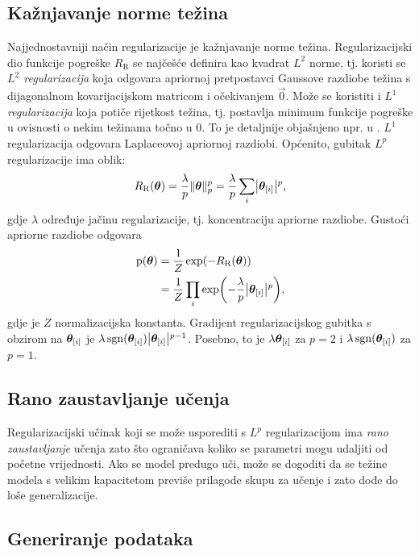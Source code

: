 \documentclass[utf8, diplomski, lmodern]{fer}
\begin{document}
\subsection{Kažnjavanje norme težina}

Najjednostavniji način regularizacije je kažnjavanje norme težina. Regularizacijski dio funkcije pogreške $R_\text{R}$ se najčešće definira kao kvadrat $L^2$ norme, tj. koristi se \emph{$L^2$ regularizacija} koja odgovara apriornoj pretpostavci Gaussove razdiobe težina s dijagonalnom kovarijacijskom matricom i očekivanjem $\vec 0$. Može se koristiti i \emph{$L^1$ regularizacija} koja potiče rijetkost težina, tj. postavlja minimum funkcije pogreške u ovisnosti o nekim težinama točno u $0$. To je detaljnije objašnjeno npr. u \citet{Goodfellow:2016:DL}. $L^1$ regularizacija odgovara Laplaceovoj apriornoj razdiobi.  Općenito, gubitak $L^p$ regularizacije ima oblik:
\begin{align}
	R_\text{R}(\vec\theta) 
	= \frac{\lambda}{p}\enVert{\vec\theta}_p^p 
	= \frac{\lambda}{p}\sum_i \envert{\vec\theta_\ind{i}}^p \text{,}
\end{align}
gdje $\lambda$ određuje jačinu regularizacije, tj. koncentraciju apriorne razdiobe. Gustoći apriorne razdiobe odgovara
\begin{align}
\p(\vec\theta) &= \frac{1}{Z}\exp(-R_\text{R}(\vec\theta)) \\
&= \frac{1}{Z}\prod_i\exp\del{-\frac{\lambda}{p}\envert{\vec\theta_\ind{i}}^p} \text{,}
\end{align}
gdje je $Z$ normalizacijska konstanta. Gradijent regularizacijskog gubitka s obzirom na $\vec\theta_\ind{i}$ je $\lambda\sgn(\vec\theta_\ind{i})\envert{\vec\theta_\ind{i}}^{p-1}$. Posebno, to je  $\lambda\vec\theta_\ind{i}$ za $p=2$ i  $\lambda\sgn(\vec\theta_\ind{i})$ za $p=1$.

\subsection{Rano zaustavljanje učenja}

Regularizacijski učinak koji se može usporediti s $L^p$ regularizacijom ima \emph{rano zaustavljanje} učenja zato što ograničava koliko se parametri mogu udaljiti od početne vrijednosti. Ako se model predugo uči, može se dogoditi da se težine modela s velikim kapacitetom previše prilagode skupu za učenje i zato dođe do loše generalizacije.

\subsection{Generiranje podataka}
\end{document}
